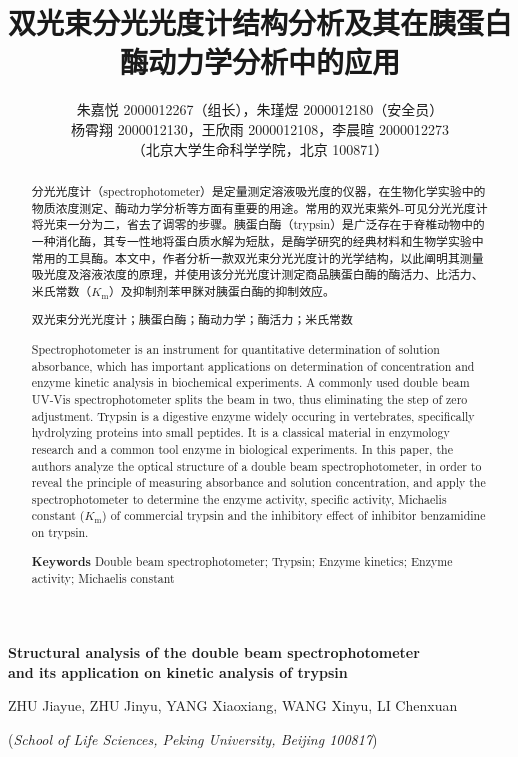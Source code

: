 \documentclass[11pt,UTF8]{ctexart}
\title{\textbf{\Large 双光束分光光度计结构分析及其在胰蛋白酶动力学分析中的应用}}
\author{\fangsong 朱嘉悦 2000012267（组长），朱瑾煜 2000012180（安全员） \\ 
        \fangsong 杨霄翔 2000012130，王欣雨 2000012108，李晨暄 2000012273 \\
        \small{\kaishu（北京大学生命科学学院，北京 100871）}}
\date{}
\providecommand{\keywords}[1] {
    \textbf{\heiti{关键词\quad{}\kaishu}} #1
}
\providecommand{\enkeywords}[1] {
    \textbf{Keywords\quad{}} #1
}
\begin{document}
    \maketitle
    \begin{abstract}
        \kaishu
        分光光度计（spectrophotometer）是定量测定溶液吸光度的仪器，在生物化学实验中的物质浓度测定、酶动力学分析等方面有重要的用途。常用的双光束紫外-可见分光光度计将光束一分为二，省去了调零的步骤。胰蛋白酶（trypsin）是广泛存在于脊椎动物中的一种消化酶，其专一性地将蛋白质水解为短肽，是酶学研究的经典材料和生物学实验中常用的工具酶。本文中，作者分析一款双光束分光光度计的光学结构，以此阐明其测量吸光度及溶液浓度的原理，并使用该分光光度计测定商品胰蛋白酶的酶活力、比活力、米氏常数（\(K_\mathrm{m}\)）及抑制剂苯甲脒对胰蛋白酶的抑制效应。

        \keywords{双光束分光光度计；胰蛋白酶；酶动力学；酶活力；米氏常数}
    \end{abstract}
    \renewcommand{\abstractname}{Abstract}

    \begin{center}
        \textbf{\Large Structural analysis of the double beam spectrophotometer \\ and its application on kinetic analysis of trypsin}
        
        \normalsize ZHU Jiayue, ZHU Jinyu, YANG Xiaoxiang, WANG Xinyu, LI Chenxuan

        \small{(\textit{School of Life Sciences, Peking University, Beijing 100817})}
    \end{center}

    \maketitle
    \begin{abstract}
        Spectrophotometer is an instrument for quantitative determination of solution absorbance, which has important applications on determination of concentration and enzyme kinetic analysis in biochemical experiments. A commonly used double beam UV-Vis spectrophotometer splits the beam in two, thus eliminating the step of zero adjustment. Trypsin is a digestive enzyme widely occuring in vertebrates, specifically hydrolyzing proteins into small peptides. It is a classical material in enzymology research and a common tool enzyme in biological experiments. In this paper, the authors analyze the optical structure of a double beam spectrophotometer, in order to reveal the principle of measuring absorbance and solution concentration, and apply the spectrophotometer to determine the enzyme activity, specific activity, Michaelis constant (\(K_\mathrm{m}\)) of commercial trypsin and the inhibitory effect of inhibitor benzamidine on trypsin.

        \enkeywords{Double beam spectrophotometer; Trypsin; Enzyme kinetics; Enzyme activity; Michaelis constant}
    \end{abstract}
\end{document}
